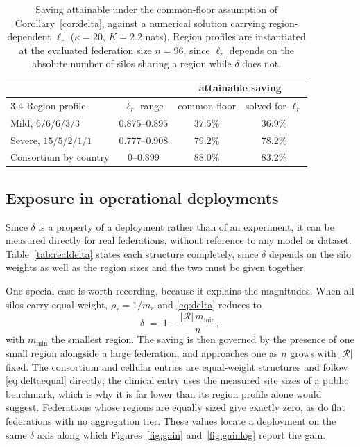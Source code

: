 \documentclass[acmsmall,screen,review,anonymous]{acmart}
\theoremstyle{acmdefinition}%
\newcommand{\Reg}{\mathcal{R}}
\begin{document}
\begin{table}[t]
\caption{Saving attainable under the common-floor assumption of Corollary~\ref{cor:delta}, against a numerical solution carrying region-dependent $\ell_r$ ($\kappa = 20$, $K = 2.2$ nats). Region profiles are instantiated at the evaluated federation size $n = 96$, since $\ell_r$ depends on the absolute number of silos sharing a region while $\delta$ does not.}
\label{tab:ellgap}
\centering
\footnotesize
\setlength{\tabcolsep}{5pt}
\begin{tabular}{@{}lccc@{}}
\toprule
& & \multicolumn{2}{c}{attainable saving} \\
\cmidrule(lr){3-4}
Region profile & $\ell_r$ range & common floor & solved for $\ell_r$ \\
\midrule
Mild, $6/6/6/3/3$ & $0.875$--$0.895$ & $37.5\%$ & $36.9\%$ \\
Severe, $15/5/2/1/1$ & $0.777$--$0.908$ & $79.2\%$ & $78.2\%$ \\
Consortium by country & $0$--$0.899$ & $88.0\%$ & $83.2\%$ \\
\bottomrule
\end{tabular}
\end{table}

\subsection{Exposure in operational deployments}

Since $\delta$ is a property of a deployment rather than of an experiment, it can
be measured directly for real federations, without reference to any model or
dataset. Table~\ref{tab:realdelta} states each structure completely, since $\delta$
depends on the silo weights as well as the region sizes and the two must be given
together.

One special case is worth recording, because it explains the magnitudes. When all
silos carry equal weight, $\rho_r = 1/m_r$ and \eqref{eq:delta} reduces to
\begin{equation}
\delta \;=\; 1 - \frac{|\Reg| \, m_{\min}}{n},
\label{eq:deltaequal}
\end{equation}
with $m_{\min}$ the smallest region. The saving is then governed by the presence of
one small region alongside a large federation, and approaches one as $n$ grows with
$|\Reg|$ fixed. The consortium and cellular entries are equal-weight structures and
follow \eqref{eq:deltaequal} directly; the clinical entry uses the measured site
sizes of a public benchmark, which is why it is far lower than its region profile
alone would suggest. Federations whose regions are equally sized give exactly zero,
as do flat federations with no aggregation tier. These values locate a deployment on
the same $\delta$ axis along which Figures~\ref{fig:gain} and~\ref{fig:gainlog}
report the gain.
\end{document}
